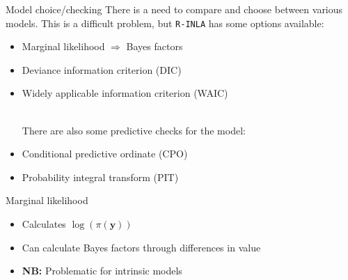 \documentclass[
  ignorenonframetext,
]{beamer}
\newenvironment{Shaded}{\begin{snugshade}}{\end{snugshade}}
\newcommand{\AttributeTok}[1]{\textcolor[rgb]{0.77,0.63,0.00}{#1}}
\newcommand{\CommentTok}[1]{\textcolor[rgb]{0.56,0.35,0.01}{\textit{#1}}}
\newcommand{\ConstantTok}[1]{\textcolor[rgb]{0.00,0.00,0.00}{#1}}
\newcommand{\FunctionTok}[1]{\textcolor[rgb]{0.00,0.00,0.00}{#1}}
\newcommand{\NormalTok}[1]{#1}
\newcommand{\OtherTok}[1]{\textcolor[rgb]{0.56,0.35,0.01}{#1}}
\newcommand{\SpecialCharTok}[1]{\textcolor[rgb]{0.00,0.00,0.00}{#1}}
\begin{document}
\begin{frame}[fragile]{Model choice/checking}
\protect\hypertarget{model-choicechecking}{}
There is a need to compare and choose between various models. This is a
difficult problem, but \texttt{R-INLA} has some options available:

\begin{itemize}
\item
  Marginal likelihood \(\Rightarrow\) Bayes factors
\item
  Deviance information criterion (DIC)
\item
  Widely applicable information criterion (WAIC)\\
  \strut \\
  There are also some predictive checks for the model:
\item
  Conditional predictive ordinate (CPO)
\item
  Probability integral transform (PIT)
\end{itemize}
\end{frame}

\begin{frame}[fragile]{Marginal likelihood}
\protect\hypertarget{marginal-likelihood}{}
\small

\begin{Shaded}
\end{Shaded}

\normalsize

\begin{itemize}
\item
  Calculates \(\log(\pi(\boldsymbol{y}))\)
\item
  Can calculate Bayes factors through differences in value
\item
  \textbf{NB:} Problematic for intrinsic models
\end{itemize}
\end{frame}
\end{document}

